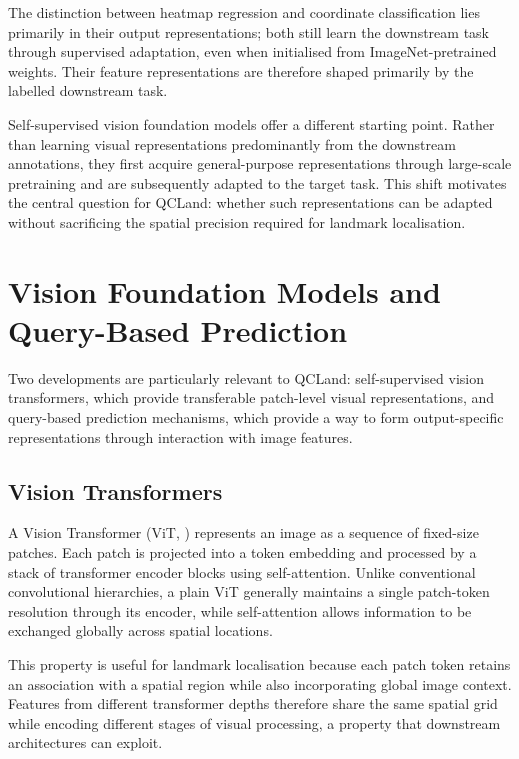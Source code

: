 The distinction between heatmap regression and coordinate
classification lies primarily in their output representations; both
still learn the downstream task through supervised adaptation, even
when initialised from ImageNet-pretrained weights. Their feature
representations are therefore shaped primarily by the labelled
downstream task.

Self-supervised vision foundation models offer a different starting
point. Rather than learning visual representations predominantly from
the downstream annotations, they first acquire general-purpose
representations through large-scale pretraining and are subsequently
adapted to the target task. This shift motivates the central question
for QCLand: whether such representations can be adapted without
sacrificing the spatial precision required for landmark localisation.



\section{Vision Foundation Models and Query-Based Prediction}
\label{sec:bg-vfm-query}

Two developments are particularly relevant to QCLand:
self-supervised vision transformers, which provide transferable
patch-level visual representations, and query-based prediction
mechanisms, which provide a way to form output-specific
representations through interaction with image features.


\subsection{Vision Transformers}
\label{sec:bg-vit}

A Vision Transformer (ViT, \textcite{dosovitskiy2021vit}) represents
an image as a sequence of fixed-size patches. Each patch is projected
into a token embedding and processed by a stack of transformer encoder
blocks using self-attention. Unlike conventional convolutional
hierarchies, a plain ViT generally maintains a single patch-token
resolution through its encoder, while self-attention allows
information to be exchanged globally across spatial locations.

This property is useful for landmark localisation because each patch
token retains an association with a spatial region while also
incorporating global image context. Features from different
transformer depths therefore share the same spatial grid while
encoding different stages of visual processing, a property that
downstream architectures can exploit.


